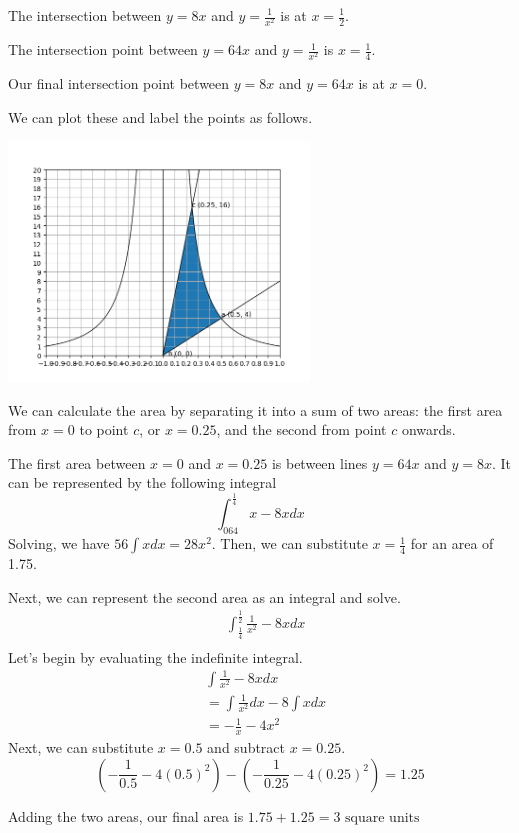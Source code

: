 \documentclass[11pt, letterpaper, twoside]{article}
\begin{document}
\begin{enumerate}
\begin{enumerate}[label=\alph*)]
The intersection between \(y=8x\) and \(y=\frac{1}{x^2}\) is at \(x=\frac{1}{2}\).

The intersection point between \(y=64x\) and \(y=\frac{1}{x^2}\) is \(x=\frac{1}{4}\).

Our final intersection point between \(y=8x\) and \(y=64x\) is at \(x=0\).

We can plot these and label the points as follows.

\includegraphics[width=0.6\textwidth]{q5b}\par\vspace{1cm}

We can calculate the area by separating it into a sum of two areas: 
the first area from \(x=0\) to point \(c\), or \(x=0.25\), and the second from point \(c\) onwards.

The first area between \(x=0\) and \(x=0.25\) is between lines \(y=64x\) and \(y=8x\).
It can be represented by the following integral
\[\int^\frac{1}{4}_064x-8x dx\]
Solving, we have \(56\int xdx=28x^2\).
Then, we can substitute \(x=\frac{1}{4}\) for an area of 1.75.

Next, we can represent the second area as an integral and solve.
\begin{align*}
&\int^\frac{1}{2}_\frac{1}{4}\frac{1}{x^2}-8xdx\\
\end{align*}
Let's begin by evaluating the indefinite integral.
\begin{align*}
&\int\frac{1}{x^2}-8xdx\\
&=\int \frac{1}{x^2}dx-8\int xdx\\
&=-\frac{1}{x}-4x^2
\end{align*}
Next, we can substitute \(x=0.5\) and subtract \(x=0.25\).
\[\left(-\frac{1}{0.5}-4(0.5)^2\right)-\left(-\frac{1}{0.25}-4(0.25)^2\right)=1.25\]

Adding the two areas, our final area is \(1.75+1.25=\boxed{3 \text{ square units}}\)
\end{enumerate}


\end{enumerate}
\end{document}
